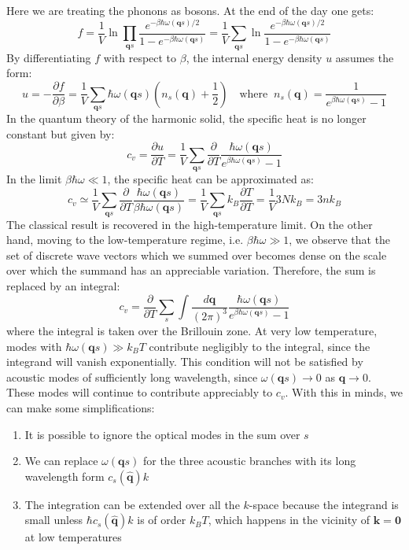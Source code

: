 \documentclass[10.75pt,a4paper,openright,bottom=2cm]{article}
\renewcommand{\Vec}[1]{\boldsymbol{#1}}
\begin{document}
Here we are treating the phonons as bosons. At the end of the day one gets:
\[
f=\frac{1}{V}\ln{\prod_{\Vec{q}s}\frac{e^{-\beta\hbar\omega(\Vec{q}s)/2}}{1-e^{-\beta\hbar\omega(\Vec{q}s)}}}=\frac{1}{V}\sum_{\Vec{q}s}\ln{\frac{e^{-\beta\hbar\omega(\Vec{q}s)/2}}{1-e^{-\beta\hbar\omega(\Vec{q}s)}}}
\]
By differentiating $f$ with respect to $\beta$, the internal energy density $u$ assumes the form:
\[
u=-\frac{\partial f}{\partial\beta}=\frac{1}{V}\sum_{\Vec{q}s}\hbar\omega(\Vec{q}s)\left(n_s(\Vec{q})+\frac{1}{2}\right) \quad \text{where}\;\; n_s(\Vec{q})=\frac{1}{e^{\beta\hbar\omega(\Vec{q}s)}-1}
\]
In the quantum theory of the harmonic solid, the specific heat is no longer constant but given by:
\[
c_v=\frac{\partial u}{\partial T}=\frac{1}{V}\sum_{\Vec{q}s}\frac{\partial}{\partial T}\frac{\hbar\omega(\Vec{q}s)}{e^{\beta\hbar\omega(\Vec{q}s)}-1}
\]
In the limit $\beta\hbar\omega\ll1$, the specific heat can be approximated as:
\[
c_v\simeq\frac{1}{V}\sum_{\Vec{q}s}\frac{\partial}{\partial T}\frac{\hbar\omega(\Vec{q}s)}{\beta\hbar\omega(\Vec{q}s)}=\frac{1}{V}\sum_{\Vec{q}s}k_B\frac{\partial T}{\partial T}=\frac{1}{V}3Nk_B=3nk_B
\]
The classical result is recovered in the high-temperature limit. On the other hand, moving to the low-temperature regime, i.e. $\beta\hbar\omega\gg1$, we observe that the set of discrete wave vectors which we summed over becomes dense on the scale over which the summand has an appreciable variation. Therefore, the sum is replaced by an integral:
\begin{equation}
\label{general}
c_v=\frac{\partial}{\partial T}\sum_s\int\frac{d\Vec{q}}{(2\pi)^3}\frac{\hbar\omega(\Vec{q}s)}{e^{\beta\hbar\omega(\Vec{q}s)}-1}
\end{equation}
where the integral is taken over the  Brillouin zone. At very low temperature, modes with $\hbar\omega(\Vec{q}s)\gg k_BT$ contribute negligibly to the integral, since the integrand will vanish exponentially. This condition will not be satisfied by acoustic modes of sufficiently long wavelength, since $\omega(\Vec{q}s)\to0$ as $\Vec{q}\to0$. These modes will continue to contribute appreciably to $c_v$. With this in minds, we can make some simplifications:
\begin{enumerate}
    \item It is possible to ignore the optical modes in the sum over $s$
    \item We can replace $\omega(\Vec{q}s)$ for the three acoustic branches with its long wavelength form $c_s(\hat{\Vec{q}})k$
    \item The integration can be extended over all the $k$-space because the integrand is small unless $\hbar c_s(\hat{\Vec{q}})k$ is of order $k_BT$, which happens in the vicinity of $\Vec{k}=\Vec{0}$ at low temperatures
\end{enumerate}
\end{document}
